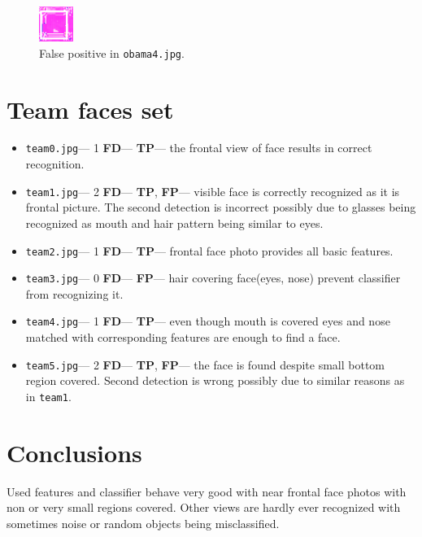 \documentclass[11pt,a4paper,twocolumn]{article}
\begin{document}
\begin{figure}[htbp]
\centering
\includegraphics[width=0.1\textwidth]{false-positive.png}
\caption{False positive in \texttt{obama4.jpg}.\label{img:false-positive}\\[0.0000000000000000000000000000001cm]}
\end{figure}

\section*{Team faces set}
\begin{itemize}
\item \texttt{team0.jpg}--- 1 \textbf{FD}--- \textbf{TP}--- the frontal view of face results in correct recognition.
\item \texttt{team1.jpg}--- 2 \textbf{FD}--- \textbf{TP}, \textbf{FP}--- visible face is correctly recognized as it is frontal picture. The second detection is incorrect possibly due to glasses being recognized as mouth and hair pattern being similar to eyes.
\item \texttt{team2.jpg}--- 1 \textbf{FD}--- \textbf{TP}--- frontal face photo provides all basic features.
\item \texttt{team3.jpg}--- 0 \textbf{FD}--- \textbf{FP}--- hair covering face(eyes, nose) prevent classifier from recognizing it.
\item \texttt{team4.jpg}--- 1 \textbf{FD}--- \textbf{TP}--- even though mouth is covered eyes and nose matched with corresponding features are enough to find a face.
\item \texttt{team5.jpg}--- 2 \textbf{FD}--- \textbf{TP}, \textbf{FP}--- the face is found despite small bottom region covered. Second detection is wrong possibly due to similar reasons as in \texttt{team1}.
\end{itemize}

\section*{Conclusions}
Used features and classifier behave very good with near frontal face photos with non or very small regions covered. Other views are hardly ever recognized with sometimes noise or random objects being misclassified.
\end{document}
